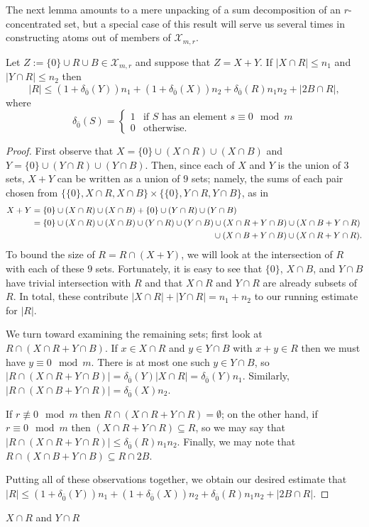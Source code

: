 The next lemma amounts to a mere unpacking of a sum decomposition of an $r$-concentrated set, but a special case of this result will serve us several times in constructing atoms out of members of $\mathcal{X}_{m,r}$.

\begin{lemma} \label{lem:both summands small}
Let $Z := \{0\}\cup R \cup B\in \mathcal{X}_{m,r}$ and suppose that $Z = X + Y$.
If $|X\cap R| \le n_1$ and $|Y\cap R|\le n_2$ then 
\[|R| \le (1+\delta_{\bar{0}}(Y))n_1 + (1+\delta_{\bar{0}}(X))n_2 + \delta_{\bar{0}}(R)n_1n_2 + |2B \cap R|,\]
where 
\[\delta_{\bar{0}}(S) = 
\begin{cases}
1& \textrm{if $S$ has an element $s \equiv 0 \mod m$} \\
0& \textrm{otherwise}.
\end{cases}\]
\end{lemma}

\begin{proof}
First observe that $X = \{0\}\cup (X\cap R) \cup (X\cap B)$ and $Y = \{0\}\cup (Y\cap R) \cup (Y\cap B)$.
Then, since each of $X$ and $Y$ is the union of $3$ sets, $X+Y$ can be written as a union of $9$ sets; namely, the sums of each pair chosen from $\{\{0\}, X\cap R, X\cap B\} \times \{ \{0\}, Y\cap R, Y\cap B\}$, as in
\begin{align*}
X+Y &= \{0\}\cup (X\cap R) \cup (X\cap B) + \{0\} \cup (Y\cap R) \cup (Y\cap B) \\
&= \{0\}\cup (X\cap R) \cup (X\cap B) \cup (Y\cap R) \cup (Y\cap B) \cup (X\cap R + Y\cap B) \cup (X\cap B + Y\cap R)\\
& \hspace{7.5cm} \hfill \cup (X\cap B + Y\cap B) \cup (X\cap R + Y\cap R).
\end{align*}
To bound the size of $R = R\cap (X+Y)$, we will look at the intersection of $R$ with each of these $9$ sets.  
Fortunately, it is easy to see that $\{0\}$, $X\cap B$, and $Y\cap B$ have trivial intersection with $R$ and that $X\cap R$ and $Y\cap R$ are already subsets of $R$.
In total, these contribute $|X\cap R| + |Y\cap R| = n_1+n_2$ to our running estimate for $|R|$.

We turn toward examining the remaining sets; first look at $R \cap (X\cap R + Y\cap B)$.
If $x\in X\cap R$ and $y\in Y\cap B$ with $x+y\in R$ then we must have $y\equiv 0 \mod m$.
There is at most one such $y\in Y\cap B$, so $|R\cap (X\cap R + Y\cap B)| =\delta_{\bar{0}}(Y)|X\cap R|=\delta_{\bar{0}}(Y)n_1$.
Similarly, $|R\cap (X\cap B + Y\cap R)| = \delta_{\bar{0}}(X)n_2$.

If $r\not\equiv 0 \mod m$ then $R \cap (X\cap R + Y\cap R) =\emptyset$; on the other hand, if $r\equiv 0 \mod m$ then $(X\cap R+Y\cap R)\subseteq R$, so we may say that $|R\cap (X\cap R + Y\cap R)| \le \delta_{\bar{0}}(R) n_1n_2$.
Finally, we may note that $R\cap (X\cap B + Y\cap B) \subseteq R\cap 2B$.

Putting all of these observations together, we obtain our desired estimate that $|R| \le (1+\delta_{\bar{0}}(Y))n_1 + (1+\delta_{\bar{0}}(X))n_2 + \delta_{\bar{0}}(R)n_1n_2 + |2B \cap R|$.
\end{proof}
$X\cap R$ and $Y\cap R$

